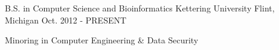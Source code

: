 

\begin{cventries}

  \cventry
    {B.S. in Computer Science and Bioinformatics} %
    {Kettering University} %
    {Flint, Michigan} %
    {Oct. 2012 - PRESENT} %
    {
      \begin{cvitems} %
        \item {Minoring in Computer Engineering \& Data Security}
      \end{cvitems}
    }

\end{cventries}
